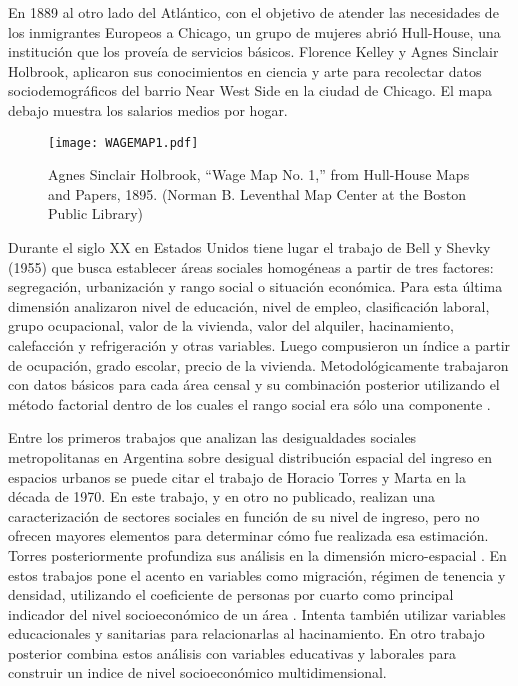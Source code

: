 En 1889 al otro lado del Atlántico, con el objetivo de atender las necesidades de los inmigrantes Europeos a Chicago, un grupo de mujeres abrió Hull-House, una institución que los proveía de servicios básicos. Florence Kelley y Agnes Sinclair Holbrook, aplicaron sus conocimientos en ciencia y arte para recolectar datos sociodemográficos del barrio Near West Side en la ciudad de Chicago. El mapa debajo muestra los salarios medios por hogar.	


\begin{figure}[t]
	\begin{center}
		\texttt{[image: WAGEMAP1.pdf]}
		\caption{Agnes Sinclair Holbrook, “Wage Map No. 1,” from Hull-House Maps and Papers, 1895. (Norman B. Leventhal Map Center at the Boston Public Library) }
	\end{center}
\end{figure}



Durante el siglo XX en Estados Unidos tiene lugar el trabajo de Bell y Shevky (1955) que busca establecer áreas sociales homogéneas a partir de tres factores: segregación, urbanización y rango social o situación económica. Para esta última dimensión analizaron nivel de educación, nivel de empleo, clasificación laboral, grupo ocupacional, valor de la vivienda, valor del alquiler, hacinamiento, calefacción y refrigeración y otras variables. Luego compusieron un índice a partir de ocupación, grado escolar, precio de la vivienda. Metodológicamente trabajaron con datos básicos para cada área censal y su combinación posterior utilizando el método factorial dentro de los cuales el rango social era sólo una componente \cite{buzai2014,betin}.  

Entre los primeros trabajos que analizan las desigualdades sociales metropolitanas en Argentina sobre desigual distribución espacial del ingreso en espacios urbanos se puede citar el trabajo de Horacio Torres y Marta  en la década de 1970. En este trabajo, y en otro no publicado, realizan una caracterización de sectores sociales en función de su nivel de ingreso, pero no ofrecen mayores elementos para determinar cómo fue realizada esa estimación. Torres posteriormente profundiza sus análisis en la dimensión micro-espacial \cite{torres1975,torres1978}. En estos trabajos pone el acento en variables como migración, régimen de tenencia y densidad, utilizando el coeficiente de personas por cuarto como principal indicador del nivel socioeconómico de un área \cite{torres1975}. Intenta también utilizar variables educacionales y sanitarias para relacionarlas al hacinamiento. En otro trabajo posterior \cite{torres1978} combina estos análisis con  variables educativas y laborales para construir un indice de nivel socioeconómico multidimensional. 

